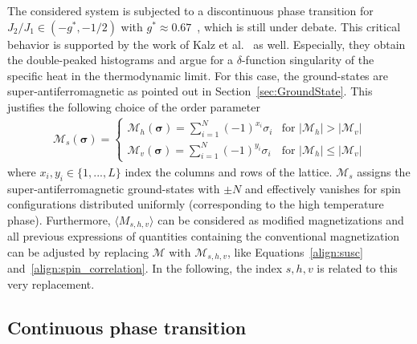The considered system is subjected to a discontinuous phase transition for $J_2/J_1\!\in\!(-g^*,-1/2)$ with $g^*\!\approx\!0.67$~\cite{Jin2012}, which is 
still under debate. This
critical behavior is supported by the work of Kalz et al.~\cite{Kalz2008} as well. Especially, they obtain the double-peaked histograms and argue
for a $\delta$-function singularity of the specific heat in the thermodynamic limit. For this case, the ground-states are super-antiferromagnetic as pointed 
out in Section~\ref{sec:GroundState}. This justifies the following choice of the order parameter
\begin{align}
    \mathcal{M}_s(\bm{\sigma}) = \begin{cases}
                                    \mathcal{M}_h(\bm{\sigma})=\sum_{i=1}^N(-1)^{x_i}\sigma_i & \text{for } |\mathcal{M}_h|>|\mathcal{M}_v| \\
                                    \mathcal{M}_v(\bm{\sigma})=\sum_{i=1}^N(-1)^{y_i}\sigma_i & \text{for } |\mathcal{M}_h|\le|\mathcal{M}_v|
                                 \end{cases}
    \label{align:stripped_magnetization}
\end{align}
where $x_i,y_i\!\in\!\{1,...,L\}$ index the columns and rows of the lattice. $\mathcal{M}_s$ assigns the super-antiferromagnetic ground-states with 
$\pm N$ and effectively vanishes for spin configurations distributed uniformly (corresponding to the high temperature phase). Furthermore, 
$\langle M_{s,h,v}\rangle$ can be considered as modified magnetizations and all previous expressions of quantities containing the conventional magnetization 
can be adjusted by replacing $\mathcal{M}$ with $\mathcal{M}_{s,h,v}$, like Equations~\eqref{align:susc} and~\eqref{align:spin_correlation}. 
In the following, the index $s,h,v$ is related to this very replacement. 





\subsection*{Continuous  phase transition}


